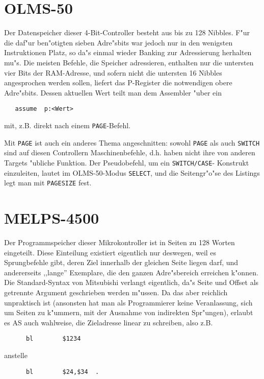 \documentclass[12pt,a4paper,twoside]{report}
\newcommand{\tty}[1]{{\tt #1}}
\begin{document}
{%

\section{OLMS-50}

Der Datenspeicher dieser 4-Bit-Controller besteht aus bis zu 128
Nibbles.  F"ur die daf"ur ben"otigten sieben Adre"sbits war
jedoch nur in den wenigsten Instruktionen Platz, so da"s einmal
wieder Banking zur Adressierung herhalten mu"s.  Die meisten
Befehle, die Speicher adressieren, enthalten nur die untersten
vier Bits der RAM-Adresse, und sofern nicht die untersten 16
Nibbles angesprochen werden sollen, liefert das P-Register die
notwendigen obere Adre"sbits.  Dessen aktuellen Wert teilt man
dem Assembler "uber ein
\begin{verbatim}
   assume  p:<Wert>
\end{verbatim}
mit, z.B. direkt nach einem \tty{PAGE}-Befehl.

Mit \tty{PAGE} ist auch ein anderes Thema angeschnitten: sowohl
\tty{PAGE} als auch \tty{SWITCH} sind auf diesen Controllern
Maschinenbefehle, d.h. haben nicht ihre von anderen Targets
"ubliche Funktion.  Der Pseudobefehl, um ein \tty{SWITCH/CASE}-
Konstrukt einzuleiten, lautet im OLMS-50-Modus \tty{SELECT}, und
die Seitengr"o"se des Listings legt man mit \tty{PAGESIZE} fest.


\section{MELPS-4500}

Der Programmspeicher dieser Mikrokontroller ist in Seiten zu
128 Worten eingeteilt.  Diese Einteilung existiert eigentlich nur
deswegen, weil es Sprungbefehle gibt, deren Ziel innerhalb der
gleichen Seite liegen darf, und andererseits ,,lange'' Exemplare,
die den ganzen Adre"sbereich erreichen k"onnen.  Die Standard-Syntax
von Mitsubishi verlangt eigentlich, da"s Seite und Offset als getrennte
Argument geschrieben werden m"ussen.  Da das aber reichlich unpraktisch
ist (ansonsten hat man als Programmierer keine Veranlassung, sich um
Seiten zu k"ummern, mit der Ausnahme von indirekten Spr"ungen), erlaubt
es AS auch wahlweise, die Zieladresse linear zu schreiben, also z.B.
\begin{verbatim}
      bl        $1234
\end{verbatim}
anstelle
\begin{verbatim}
      bl        $24,$34  .
\end{verbatim}

}
\end{document}
